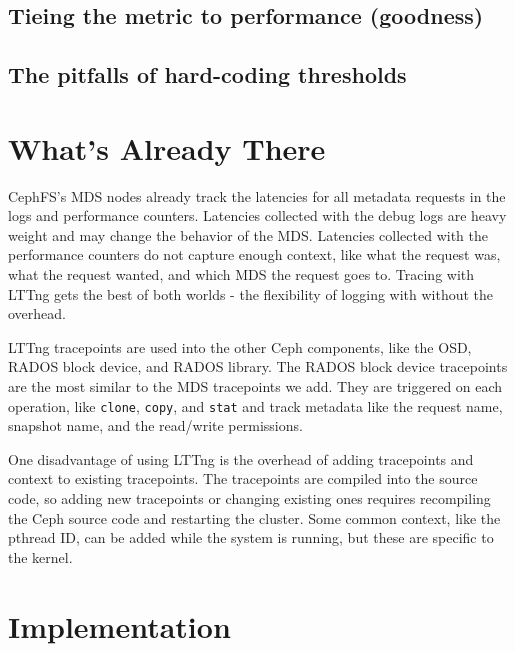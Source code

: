 \documentclass[conference]{acm_proc_article-sp} \usepackage[english]{babel}
\begin{document}
\subsection{Tieing the metric to performance (goodness)}

\subsection{The pitfalls of hard-coding thresholds}

\section{What's Already There}


CephFS's MDS nodes already track the latencies for all metadata requests in the
logs and  performance counters. Latencies collected with the debug logs are
heavy weight and may change the behavior of the MDS. Latencies collected with
the performance counters do not capture enough context, like what the request
was, what the request wanted, and which MDS the request goes to.  Tracing with
LTTng gets the best of both worlds - the flexibility of logging with without
the overhead. 


LTTng tracepoints are used into the other Ceph components, like the OSD, RADOS
block device, and RADOS library. The RADOS block device tracepoints are the
most similar to the MDS tracepoints we add. They are triggered on each
operation, like \texttt{clone}, \texttt{copy}, and \texttt{stat} and track
metadata like the request name, snapshot name, and the read/write permissions.


One disadvantage of using LTTng is the overhead of adding tracepoints and
context to existing tracepoints. The tracepoints are compiled into the source
code, so adding new tracepoints or changing existing ones requires recompiling
the Ceph source code and restarting the cluster. Some common context, like the
pthread ID, can be added while the system is running, but these are specific to
the kernel. 

\section{Implementation}

\label{implementation}
\end{document}

